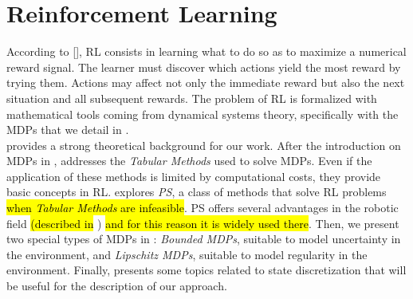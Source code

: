 \chapter{Reinforcement Learning} \label{chap:rl}

According to [\cite{sutton2018reinforcement}], \acf{RL} consists in learning what to do so as to maximize a numerical reward signal. The learner must discover which actions yield the most reward by trying them. Actions may affect not only the immediate reward but also the next situation and all subsequent rewards. The problem of \ac{RL} is formalized with mathematical tools coming from dynamical systems theory, specifically with the \acf{MDPs} that we detail in .\\
\newline
{} provides a strong theoretical background for our work. After the introduction on \ac{MDPs} in ,  addresses the \emph{Tabular Methods} used to solve \ac{MDPs}. Even if the application of these methods is limited by computational costs, they provide basic concepts in \ac{RL}.  explores \emph{\acf{PS}}, a class of methods that solve \ac{RL} problems \hl{when \emph{Tabular Methods} are infeasible}. \ac{PS} offers several advantages in the robotic field \hl{(described in }) \hl{and for this reason it is widely used there}. Then, we present two special types of \ac{MDPs} in : \emph{Bounded \ac{MDPs}}, suitable to model uncertainty in the environment, and \emph{Lipschitz \ac{MDPs}}, suitable to model regularity in the environment. Finally,  presents some topics related to state discretization that will be useful for the description of our approach.

